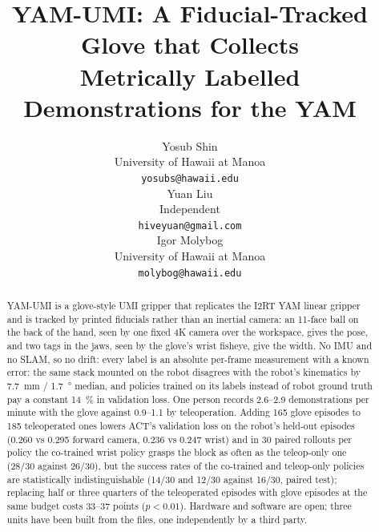 \documentclass{article}
\title{YAM-UMI: A Fiducial-Tracked Glove that Collects\\Metrically Labelled Demonstrations for the YAM}
\author{
  Yosub Shin \\
  University of Hawaii at Manoa \\
  \texttt{yosubs@hawaii.edu} \\
  \And
  Yuan Liu \\
  Independent \\
  \texttt{hiveyuan@gmail.com} \\
  \And
  Igor Molybog \\
  University of Hawaii at Manoa \\
  \texttt{molybog@hawaii.edu} \\
}
\begin{document}
\maketitle

\begin{abstract}
YAM-UMI is a glove-style UMI gripper that replicates the I2RT YAM linear gripper and is tracked by printed fiducials rather than an inertial camera: an 11-face ball on the back of the hand, seen by one fixed 4K camera over the workspace, gives the pose, and two tags in the jaws, seen by the glove's wrist fisheye, give the width. No IMU and no SLAM, so no drift: every label is an absolute per-frame measurement with a known error: the same stack mounted on the robot disagrees with the robot's kinematics by \SI{7.7}{mm} / \SI{1.7}{\degree} median, and policies trained on its labels instead of robot ground truth pay a constant \SI{14}{\percent} in validation loss. One person records 2.6--2.9 demonstrations per minute with the glove against 0.9--1.1 by teleoperation. Adding 165 glove episodes to 185 teleoperated ones lowers ACT's validation loss on the robot's held-out episodes (0.260 vs 0.295 forward camera, 0.236 vs 0.247 wrist) and in 30 paired rollouts per policy the co-trained wrist policy grasps the block as often as the teleop-only one (28/30 against 26/30), but the success rates of the co-trained and teleop-only policies are statistically indistinguishable (14/30 and 12/30 against 16/30, paired test); replacing half or three quarters of the teleoperated episodes with glove episodes at the same budget costs 33--37 points ($p<0.01$). Hardware and software are open; three units have been built from the files, one independently by a third party.
\end{abstract}
\end{document}
